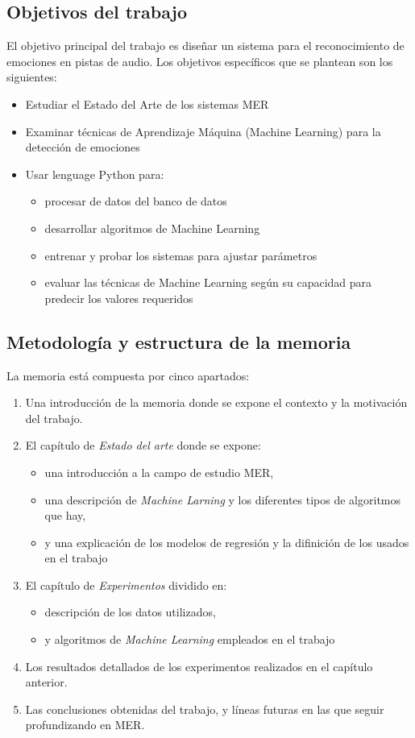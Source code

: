\documentclass[12pt,a4paper,Spanish]{article}
\begin{document}
\subsection{Objetivos del trabajo}
El objetivo principal del trabajo es diseñar un sistema para el reconocimiento de emociones en pistas de audio.
Los objetivos específicos que se plantean son los siguientes:
\begin{itemize}
\item Estudiar el Estado del Arte de los sistemas MER
\item Examinar técnicas de Aprendizaje Máquina (Machine Learning) para la detección de emociones
\item Usar lenguage Python para:
 	\begin{itemize}
 		\item procesar de datos del banco de datos 
 		\item desarrollar algoritmos de Machine Learning
 		\item entrenar y probar los sistemas para ajustar parámetros
 		\item evaluar las técnicas de Machine Learning según su capacidad para predecir los valores requeridos 		
 	\end{itemize}
\end{itemize}

\subsection{Metodología y estructura de la memoria}
La memoria está compuesta por cinco apartados:
\begin{enumerate}
	\item Una introducción de la memoria donde se expone el contexto y la motivación del trabajo.
	\item El capítulo de \textit{Estado del arte} donde se expone:
	\begin{itemize}
		\item una introducción a la campo de estudio MER,
		\item una descripción de \textit{Machine Larning} y los diferentes tipos de algoritmos que hay, 
		\item y una explicación de los modelos de regresión y la difinición de los usados en el trabajo
	\end{itemize}
	\item El capítulo de \textit{Experimentos} dividido en:
	\begin{itemize}
		\item descripción de los datos utilizados,
		\item y algoritmos de \textit{Machine Learning} empleados en el trabajo
	\end{itemize}
	\item Los resultados detallados de los experimentos realizados en el capítulo anterior.
	\item Las conclusiones obtenidas del trabajo, y líneas futuras en las que seguir profundizando en MER.
\end{enumerate}
\end{document}
